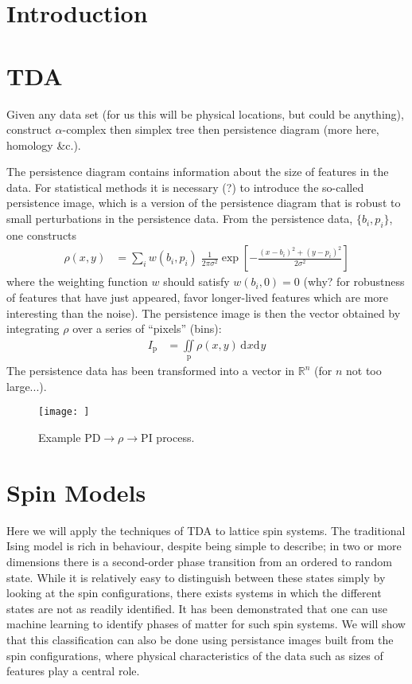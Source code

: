 \documentclass[11pt]{article}
\renewcommand{\d}[2][]{\mathrm{d}^{#1}{#2}}
\begin{document}
\section{Introduction}


\section{TDA}
Given any data set (for us this will be physical locations, but could be anything), construct $\alpha$-complex then simplex tree then persistence diagram (more here, homology \&c.).

The persistence diagram contains information about the size of features in the data. For statistical methods it is necessary (?) to introduce the so-called persistence image, which is a version of the persistence diagram that is robust to small perturbations in the persistence data. From the persistence data, $\{b_i,p_i\}$, one constructs
\begin{align}
    \rho(x,y) &= \sum_i w(b_i,p_i)\;\frac{1}{2\pi\sigma^2}\exp\left[-\frac{(x-b_i)^2+(y-p_i)^2}{2\sigma^2}\right]
\end{align}
where the weighting function $w$ should satisfy $w(b_i,0)=0$ (why? for robustness of features that have just appeared, favor longer-lived features which are more interesting than the noise). The persistence image is then the vector obtained by integrating $\rho$ over a series of ``pixels'' (bins):
\begin{align}
    I_\text{p} &= \iint\limits_\text{p}\rho(x,y)\,\d{x}\d{y}
\end{align}
The persistence data has been transformed into a vector in $\mathbb{R}^n$ (for $n$ not too large...).

\begin{figure}[b]
    \centering
    \texttt{[image: ]}
    \caption{Example PD$\rightarrow\rho\rightarrow$PI process.}
\end{figure}



\section{Spin Models}
Here we will apply the techniques of TDA to lattice spin systems. The traditional Ising model is rich in behaviour, despite being simple to describe; in two or more dimensions there is a second-order phase transition from an ordered to random state. While it is relatively easy to distinguish between these states simply by looking at the spin configurations, there exists systems in which the different states are not as readily identified. It has been demonstrated that one can use machine learning to identify phases of matter for such spin systems. We will show that this classification can also be done using persistance images built from the spin configurations, where physical characteristics of the data such as sizes of features play a central role.
\end{document}
